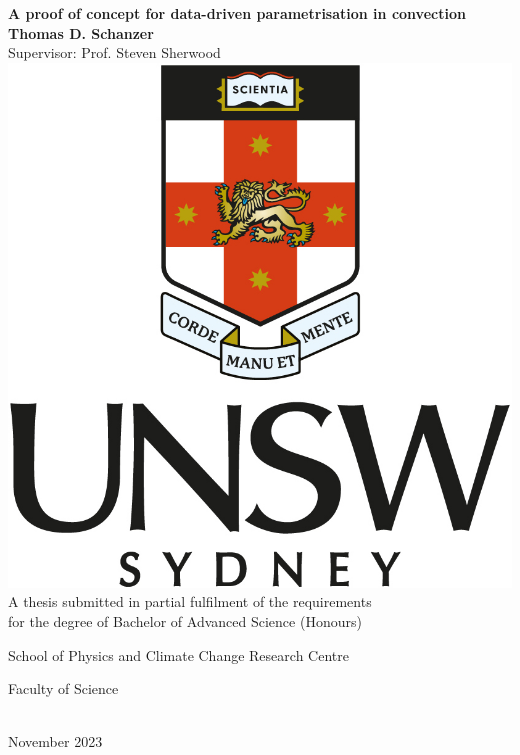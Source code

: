 \documentclass[../main.tex]{subfiles}
\begin{document}
\frontmatter
\begin{titlepage}
\vspace*{\fill}
\begin{center}
    {\Huge \textbf{%
        A proof of concept for data-driven parametrisation in
        \rb{} convection
    }} \\
    \vspace{1.5cm}
    {\Large\textbf{Thomas D. Schanzer}} \\
    \vspace{6pt}
    {\large Supervisor: Prof. Steven Sherwood} \\
    \vfill
    \includegraphics[width=0.3\linewidth]{figures/unsw_logo.jpg} \\
    \vspace{2cm}
    {\large%
         A thesis submitted in partial fulfilment of the requirements \\ for
         the degree of Bachelor of Advanced Science (Honours)
    } \\
    \vspace{0.75cm}
    {\large%
        School of Physics and Climate Change Research Centre

        Faculty of Science
    } \\
    \vspace{0.75cm}
    {\large November 2023}
\end{center}
\end{titlepage}
\end{document}
